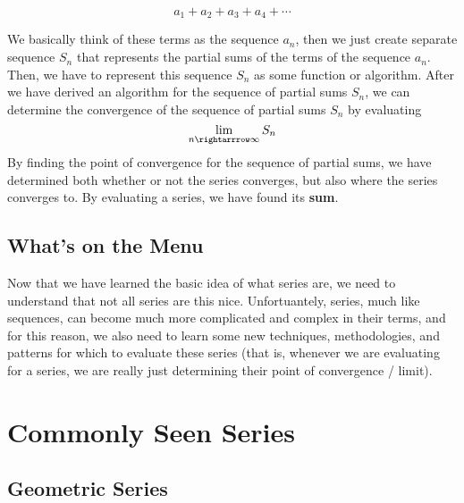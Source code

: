 \documentclass{report}
\newtheorem{definition}{Definition}
\begin{document}
\begin{sloppypar}
\[ a_{1} + a_{2} + a_{3} + a_{4} + \cdots \]

We basically think of these terms as the sequence $ a_{n} $, then we just
create separate sequence $ S_{n} $ that represents the partial sums of
the terms of the sequence $ a_{n}$. Then, we have to represent this
sequence $ S_{n} $ as some function or algorithm. After we have
derived an algorithm for the sequence of partial sums $ S_{n} $, we can
determine the convergence of the sequence of partial sums $ S_{n} $ by
evaluating
\[ \lim_{n \rightarrrow \infty} S_{n} \]
By finding the point of convergence for the sequence of partial sums,
we have determined both whether or not the series converges, but
also where the series converges to. By evaluating a series, we have
found its \textbf{sum}.

\subsection{What's on the Menu}
Now that we have learned the basic idea of what series are, we need
to understand that not all series are this nice. Unfortuantely,
series, much like sequences, can become much more complicated and complex
in their terms, and for this reason, we also need to learn some new
techniques, methodologies, and patterns for which to evaluate
these series (that is, whenever we are evaluating for a series, we are
really just determining their point of convergence / limit).

\section{Commonly Seen Series}
\subsection{Geometric Series
}
\end{sloppypar}
\end{document}
